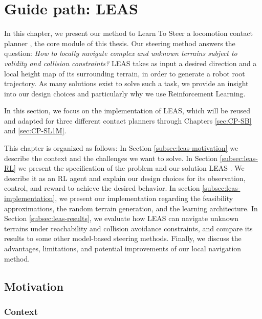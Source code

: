 

\chapter{Guide path: LEAS}
\label{sec:LEAS}
\minitoc
\bigskip

In this chapter, we present our method to Learn To Steer a locomotion contact planner , the core module of this thesis. 
Our steering method answers the question: \textit{How to locally navigate complex and unknown terrains subject to validity and collision constraints?}
LEAS takes as input a desired direction and a local height map of its surrounding terrain, in order to generate a robot root trajectory.
As many solutions exist to solve such a task, we provide an insight into our design choices and particularly why we use Reinforcement Learning.

In this section, we focus on the implementation of LEAS, which will be reused and adapted for three different contact planners through Chapters \ref{sec:CP-SB} and \ref{sec:CP-SL1M}.

This chapter is organized as follows: 
In Section \ref{subsec:leas-motivation} we describe the context and the challenges we want to solve. In Section \ref{subsec:leas-RL} we present the specification of the problem and our solution LEAS \cite{LEAS}. We describe it as an RL agent and explain our design choices for its observation, control, and reward to achieve the desired behavior.
In section \ref{subsec:leas-implementation}, we present our implementation regarding the feasibility approximations, the random terrain generation, and the learning architecture.
In Section \ref{subsec:leas-results}, we evaluate how LEAS can navigate unknown terrains under reachability and collision avoidance constraints, and compare its results to some other model-based steering methods.
Finally, we discuss the advantages, limitations, and potential improvements of our local navigation method.

\section{Motivation\label{subsec:leas-motivation}}
\subsection{Context\label{subsubsec:context}}

